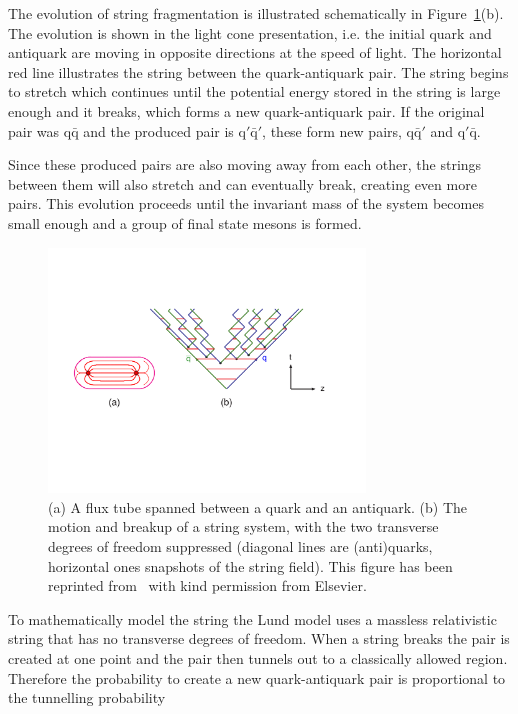 \begin{sloppypar}
The evolution of string fragmentation is illustrated schematically in Figure~\ref{fig:fluxtube}(b). The evolution is shown in the light cone presentation, i.e. the initial quark and antiquark are moving in opposite directions at the speed of light. The horizontal red line illustrates the string between the quark-antiquark pair. The string begins to stretch which continues until the potential energy stored in the string is large enough and it breaks, which forms a new quark-antiquark pair. If the original pair was $\mathrm{q \bar q}$ and the produced pair is $\mathrm{q'\bar q'}$, these form new pairs, $\mathrm{q \bar q'}$ and $\mathrm{q'\bar q}$.
\end{sloppypar}
Since these produced pairs are also moving away from each other, the strings between them will also stretch and can eventually break, creating even more pairs. This evolution proceeds until the invariant mass of the system becomes small enough and a group of final state mesons is formed. 

\begin{figure}
\centering
\includegraphics[width=0.75\textwidth]{figures/stringone.pdf}
\caption[]{ (a) A flux tube spanned between a quark and an antiquark. (b) The motion
and breakup of a string system, with the two transverse degrees of freedom suppressed
(diagonal lines are (anti)quarks, horizontal ones snapshots of the string field). This figure has been reprinted from~\cite{eventGenerators} with kind permission from Elsevier.}
\label{fig:fluxtube}
\end{figure}

To mathematically model the string the Lund model uses a massless relativistic string that has no transverse degrees of freedom.  When a string breaks the pair is created at one point and the pair then tunnels out to a classically allowed region. Therefore the probability to create a new quark-antiquark pair is proportional to the tunnelling probability~\cite{ANDERSSON198331}


